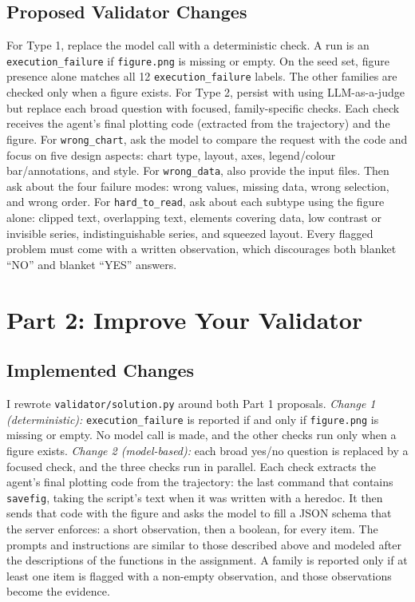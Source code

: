\documentclass[11pt]{article}
\begin{document}
\subsection{Proposed Validator Changes}
For Type 1, replace the model call with a deterministic check. A run is an
\texttt{execution\_failure} if \texttt{figure.png} is missing or empty. On the
seed set, figure presence alone matches all 12 \texttt{execution\_failure}
labels. The other families are checked only when a figure exists. For Type 2, persist with using LLM-as-a-judge but replace each broad question with focused, family-specific checks. Each check
receives the agent's final plotting code (extracted from the trajectory) and
the figure. For \texttt{wrong\_chart}, ask the model to compare the request
with the code and focus on five design aspects: chart type, layout, axes,
legend/colour bar/annotations, and style. For \texttt{wrong\_data}, also
provide the input files. Then ask about the four failure modes: wrong values, missing data, wrong selection, and wrong order. For
\texttt{hard\_to\_read}, ask about each subtype using the
figure alone: clipped text, overlapping text, elements covering data, low
contrast or invisible series, indistinguishable series, and squeezed layout.
Every flagged problem must come with a written observation, which discourages
both blanket ``NO'' and blanket ``YES'' answers.

\section{Part 2: Improve Your Validator}

\subsection{Implemented Changes}
I rewrote \texttt{validator/solution.py} around both Part 1 proposals. \emph{Change 1 (deterministic):} \texttt{execution\_failure} is reported
if and only if \texttt{figure.png} is missing or empty. No model call is made,
and the other checks run only when a figure exists. \emph{Change 2
(model-based):} each broad yes/no question is replaced by a focused check, and
the three checks run in parallel. Each check extracts the agent's final plotting
code from the trajectory: the last command that contains \texttt{savefig},
taking the script's text when it was written with a heredoc. It then sends that
code with the figure and asks the model to fill a JSON schema that the server
enforces: a short observation, then a boolean, for every item. The prompts and instructions are similar to those described above and modeled after the descriptions of the functions in the assignment. A family is reported only if
at least one item is flagged with a non-empty observation, and those
observations become the evidence.
\end{document}
